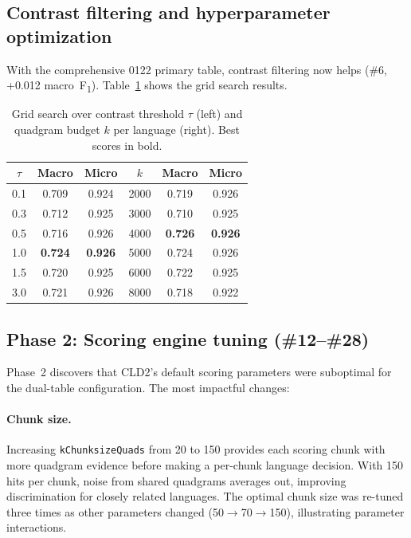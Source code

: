 \documentclass{article}
\newcommand{\fone}{F\textsubscript{1}}
\begin{document}
\subsection{Contrast filtering and hyperparameter optimization}
\label{sec:threshold}

With the comprehensive 0122 primary table, contrast filtering now helps (\#6, +0.012 macro~\fone{}).
Table~\ref{tab:threshold} shows the grid search results.

\begin{table}[t]
\centering
\small
\begin{tabular}{@{}ccc|ccc@{}}
\toprule
$\tau$ & Macro & Micro & $k$ & Macro & Micro \\
\midrule
0.1 & 0.709 & 0.924 & 2000 & 0.719 & 0.926 \\
0.3 & 0.712 & 0.925 & 3000 & 0.710 & 0.925 \\
0.5 & 0.716 & 0.926 & 4000 & \textbf{0.726} & \textbf{0.926} \\
1.0 & \textbf{0.724} & \textbf{0.926} & 5000 & 0.724 & 0.926 \\
1.5 & 0.720 & 0.925 & 6000 & 0.722 & 0.925 \\
3.0 & 0.721 & 0.926 & 8000 & 0.718 & 0.922 \\
\bottomrule
\end{tabular}
\caption{Grid search over contrast threshold $\tau$ (left) and quadgram budget $k$ per language (right). Best scores in bold.}
\label{tab:threshold}
\end{table}

\subsection{Phase 2: Scoring engine tuning (\#12--\#28)}
\label{sec:phase2}

Phase~2 discovers that CLD2's default scoring parameters were suboptimal for the dual-table configuration.
The most impactful changes:

\paragraph{Chunk size.}
Increasing \texttt{kChunksizeQuads} from 20 to 150 provides each scoring chunk with more quadgram evidence before making a per-chunk language decision.
With 150 hits per chunk, noise from shared quadgrams averages out, improving discrimination for closely related languages.
The optimal chunk size was re-tuned three times as other parameters changed (50$\to$70$\to$150), illustrating parameter interactions.
\end{document}
